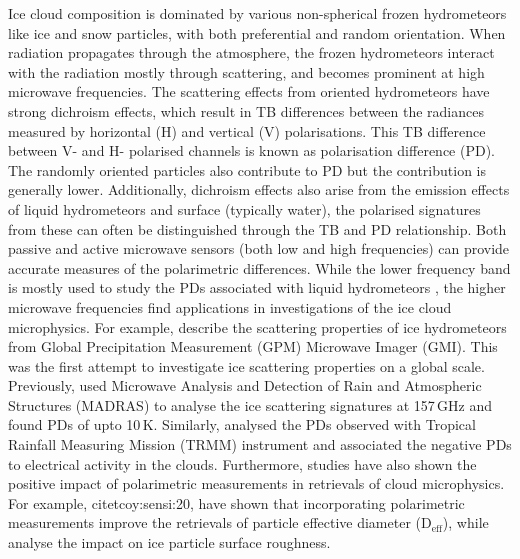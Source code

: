 \documentclass[amt, manuscript]{copernicus}
\begin{document}
Ice cloud composition is dominated by various non-spherical frozen hydrometeors like ice and snow particles, with both preferential and random orientation. When radiation propagates through the atmosphere, the frozen hydrometeors interact with the radiation mostly through scattering, and becomes prominent at high microwave frequencies. The scattering effects from oriented hydrometeors have strong dichroism effects, which result in TB differences between the radiances measured by horizontal (H) and vertical (V) polarisations. This TB difference between V- and H- polarised channels is known as polarisation difference (PD). The randomly oriented particles also contribute to PD but the contribution is generally lower. Additionally, dichroism effects also arise from the emission effects of liquid hydrometeors and surface (typically water), the polarised signatures from these can often be distinguished through the TB and PD relationship. Both passive and active microwave  sensors (both low and high frequencies) can provide accurate measures of the polarimetric differences. While the lower frequency band is mostly used to study the PDs associated with liquid hydrometeors \citep{czekala:discr:01, czekala:inter:01, prigent:micro:01}, the higher microwave frequencies find applications in investigations of the ice cloud microphysics. For example, \citet{gong:micro:17} describe the scattering properties of ice hydrometeors from  Global Precipitation Measurement (GPM) Microwave Imager (GMI). This was the first attempt to investigate ice scattering properties on a global scale. Previously, \citet{defer:first:14} used Microwave Analysis and Detection of Rain and Atmospheric Structures (MADRAS) to analyse the ice scattering signatures at 157\,GHz and found PDs of upto 10\,K. Similarly, \citet{prigent:relat:05}  analysed the PDs observed with Tropical Rainfall Measuring Mission (TRMM) instrument and associated the negative PDs to electrical activity in the clouds. Furthermore, studies have also shown the positive impact of polarimetric measurements in retrievals of cloud microphysics. For example, citet{coy:sensi:20}, have shown  that incorporating polarimetric measurements improve the retrievals of particle effective diameter (D$_{\text{eff}}$), while \citet{hioki:degre:16} analyse the impact on ice particle surface roughness.
\end{document}
